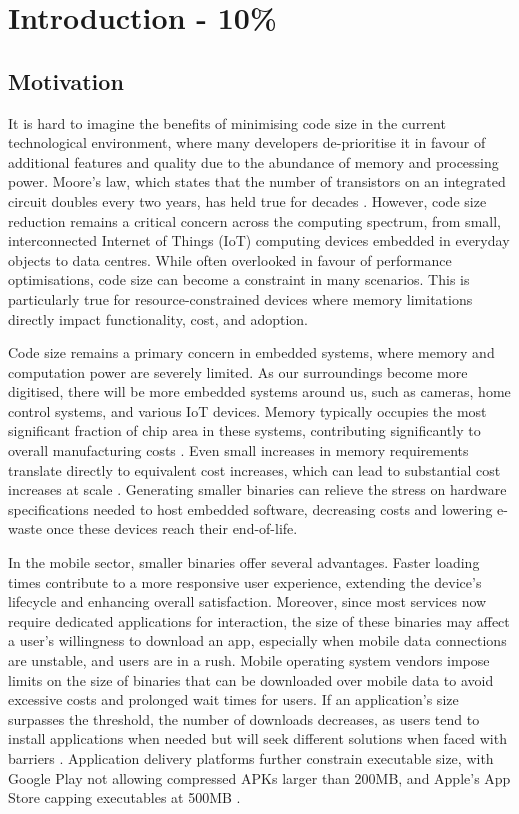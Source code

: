 \chapter{Introduction - 10\%} \label{cha:intro}
\section{Motivation}
It is hard to imagine the benefits of minimising code size in the current technological environment, where many developers de-prioritise it in favour of additional features and quality due to the abundance of memory and processing power. Moore's law, which states that the number of transistors on an integrated circuit doubles every two years, has held true for decades \cite{MooresLaw}. However, code size reduction remains a critical concern across the computing spectrum, from small, interconnected Internet of Things (IoT) computing devices embedded in everyday objects to data centres. While often overlooked in favour of performance optimisations, code size can become a constraint in many scenarios. This is particularly true for resource-constrained devices where memory limitations directly impact functionality, cost, and adoption.

Code size remains a primary concern in embedded systems, where memory and computation power are severely limited. As our surroundings become more digitised, there will be more embedded systems around us, such as cameras, home control systems, and various IoT devices. Memory typically occupies the most significant fraction of chip area in these systems, contributing significantly to overall manufacturing costs \cite{EmbeddedSystemMemoryArea}. Even small increases in memory requirements translate directly to equivalent cost increases, which can lead to substantial cost increases at scale \cite{EmbeddedSystemMemoryCost}. Generating smaller binaries can relieve the stress on hardware specifications needed to host embedded software, decreasing costs and lowering e-waste once these devices reach their end-of-life.

In the mobile sector, smaller binaries offer several advantages. Faster loading times contribute to a more responsive user experience, extending the device's lifecycle and enhancing overall satisfaction. Moreover, since most services now require dedicated applications for interaction, the size of these binaries may affect a user's willingness to download an app, especially when mobile data connections are unstable, and users are in a rush. Mobile operating system vendors impose limits on the size of binaries that can be downloaded over mobile data to avoid excessive costs and prolonged wait times for users. If an application's size surpasses the threshold, the number of downloads decreases, as users tend to install applications when needed but will seek different solutions when faced with barriers \cite{UberBinarySize}. Application delivery platforms further constrain executable size, with Google Play not allowing compressed APKs larger than 200MB, and Apple's App Store capping executables at 500MB \cite{GoogleBuildSize}\cite{AppleBuildSize}.

